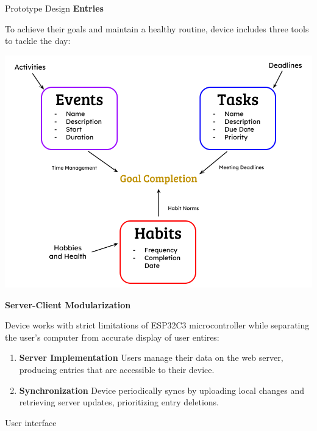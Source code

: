\documentclass[final]{beamer}
\newlength{\colwidth}
\begin{document}
\begin{frame}[t]
\begin{columns}[t]
\begin{column}{\colwidth}
    \begin{block}{Prototype Design}
    \textbf{Entries}

    To achieve their goals and maintain a healthy routine, device includes three tools to tackle the day:

    \begin{center}
      \includegraphics{entry_logic.png}
    \end{center}

    \textbf{Server-Client Modularization}

    Device works with strict limitations of ESP32C3 microcontroller while separating the user's computer from accurate display of user entires:

    \begin{enumerate}
      \item \textbf{Server Implementation} Users manage their data on the web server, producing entries that are accessible to their device.
      \item \textbf{Synchronization} Device periodically syncs by uploading local changes and retrieving server updates, prioritizing entry deletions.
    \end{enumerate}

    \end{block}

    \begin{block}{User interface}


\end{block}
\end{column}
\end{columns}
\end{frame}
\end{document}
